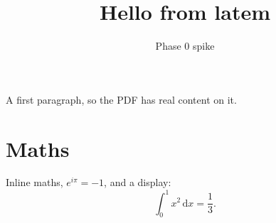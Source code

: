 \documentclass{article}
\title{Hello from latem}
\author{Phase 0 spike}
\begin{document}
\maketitle

A first paragraph, so the PDF has real content on it.

\section{Maths}
Inline maths, $e^{i\pi} = -1$, and a display:
\[
  \int_0^1 x^2 \, \mathrm{d}x = \frac{1}{3}.
\]
\end{document}
